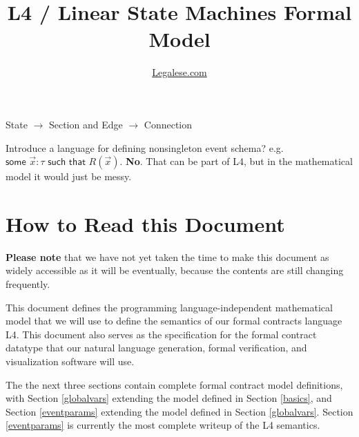 \documentclass[12pt]{article}
\author{\href{https://legalese.com}{Legalese.com}}
\title{L4 / Linear State Machines Formal Model}
\begin{document}
\maketitle



\noindent 

\begin{PPI}
\item State $\to$ Section and Edge $\to$ Connection
\item Introduce a language for defining nonsingleton event schema? e.g. $\textsf{some } \vec{x}:\tau \textsf{ such that } R(\vec{x})$. {\bf No}. That can be part of L4, but in the mathematical model it would just be messy.
%
\end{PPI}

\tableofcontents

\section{How to Read this Document} 
{\bf Please note} that we have not yet taken the time to make this document as widely accessible as it will be eventually, because the contents are still changing frequently.

This document defines the programming language-independent mathematical model that we will use to define the semantics of our formal contracts language L4. This document also serves as the specification for the formal contract datatype that our natural language generation, formal verification, and visualization software will use.

The the next three sections contain complete formal contract model definitions, with Section \ref{globalvars} extending the model defined in Section \ref{basics}, and Section \ref{eventparams} extending the model defined in Section \ref{globalvars}. Section \ref{eventparams} is currently the most complete writeup of the L4 semantics. 
\end{document}
